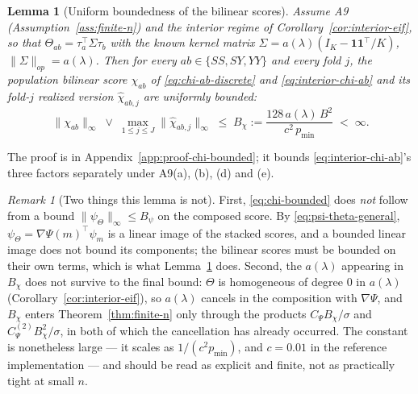 \documentclass[11pt]{article}
\theoremstyle{plain}
\newtheorem{lemma}[theorem]{Lemma}
\theoremstyle{definition}
\theoremstyle{remark}
\newtheorem{remark}[theorem]{Remark}
\begin{document}
\begin{lemma}[Uniform boundedness of the bilinear scores]\label{lem:chi-bounded}
Assume A9 (Assumption~\ref{ass:finite-n}) and the interior regime of
Corollary~\ref{cor:interior-eif}, so that $\Theta_{ab}=\tau_a^\top\Sigma\tau_b$ with the
\emph{known} kernel matrix $\Sigma=a(\lambda)(I_K-\mathbf1\mathbf1^\top/K)$,
$\|\Sigma\|_{op}=a(\lambda)$. Then for every $ab\in\{SS,SY,YY\}$ and every fold $j$, the
population bilinear score $\chi_{ab}$ of \eqref{eq:chi-ab-discrete} and
\eqref{eq:interior-chi-ab} and its fold-$j$ realized version $\hat\chi_{ab,j}$ are
uniformly bounded:
\begin{equation}\label{eq:chi-bounded}
    \|\chi_{ab}\|_\infty\;\vee\;\max_{1\le j\le J}\|\hat\chi_{ab,j}\|_\infty\;\le\;B_\chi:=\frac{128\,a(\lambda)\,B^2}{c^2\,p_{\min}}\;<\;\infty .
\end{equation}
\end{lemma}

The proof is in Appendix~\ref{app:proof-chi-bounded}; it bounds
\eqref{eq:interior-chi-ab}'s three factors separately under A9(a), (b), (d) and (e).

\begin{remark}[Two things this lemma is not]\label{rem:chi-bounded-scope}
First, \eqref{eq:chi-bounded} does \emph{not} follow from a bound
$\|\psi_\Theta\|_\infty\le B_\psi$ on the composed score. By
\eqref{eq:psi-theta-general}, $\psi_\Theta=\nabla\Psi(m)^\top\psi_m$ is a linear image
of the stacked scores, and a bounded linear image does not bound its components; the
bilinear scores must be bounded on their own terms, which is what
Lemma~\ref{lem:chi-bounded} does. Second, the $a(\lambda)$ appearing in $B_\chi$ does not
survive to the final bound: $\Theta$ is homogeneous of degree $0$ in $a(\lambda)$
(Corollary~\ref{cor:interior-eif}), so $a(\lambda)$ cancels in the composition with
$\nabla\Psi$, and $B_\chi$ enters Theorem~\ref{thm:finite-n} only through the products
$C_\Psi B_\chi/\sigma$ and $C^{(2)}_\Psi B_\chi^2/\sigma$, in both of which the
cancellation has already occurred. The constant is
nonetheless large --- it scales as $1/(c^2p_{\min})$, and $c=0.01$ in the reference
implementation --- and should be read as explicit and finite, not as practically tight at
small $n$.
\end{remark}
\end{document}

